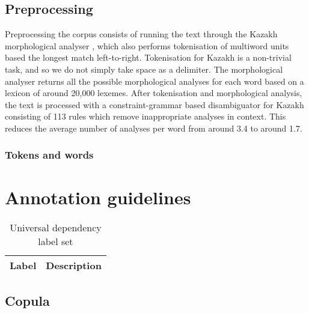 \documentclass[a4paper,11pt, onecolumn,twoside]{article}
\begin{document}
\subsection{Preprocessing}

Preprocessing the corpus consists of running the text through the Kazakh morphological
analyser \citep{Washington14}, which also performs tokenisation of multiword units based 
the longest match left-to-right. Tokenisation for Kazakh is a non-trivial task, and so
we do not simply take space as a delimiter. The morphological analyser returns all 
the possible morphological analyses for each word based on a lexicon of around 20,000 lexemes.
After tokenisation and morphological analysis, the text is processed with a constraint-grammar 
based disambiguator for Kazakh consisting of 113 rules which remove inappropriate 
analyses in context. This reduces the average number of analyses per word from around 3.4
to around 1.7.


\subsubsection{Tokens and words}


\section{Annotation guidelines}



\begin{table}[htbp]
  \centering
  \begin{tabular}{|l|l|}
    \hline
    \textbf{Label} & \textbf{Description} \\

    \hline
  \end{tabular}
  \caption{Universal dependency label set}
\end{table}

\subsection{Copula}
\end{document}
